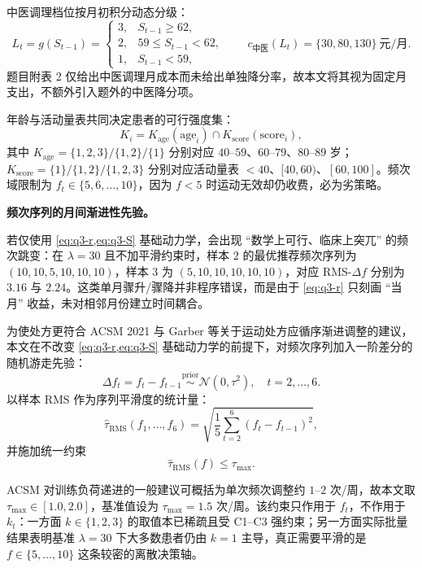 \documentclass{MathorCupmodeling}
\begin{document}
中医调理档位按月初积分动态分级：
\begin{equation}\label{eq:q3-L}
L_t = g(S_{t-1}) =
\begin{cases}
3, & S_{t-1} \ge 62, \\
2, & 59 \le S_{t-1} < 62, \\
1, & S_{t-1} < 59,
\end{cases}
\qquad c_{\text{中医}}(L_t)=\{30,80,130\}\ \text{元/月}.
\end{equation}
题目附表 2 仅给出中医调理月成本而未给出单独降分率，故本文将其视为固定月支出，不额外引入题外的中医降分项。

年龄与活动量表共同决定患者的可行强度集：
\begin{equation}
K_i = K_{\text{age}}(\text{age}_i) \cap K_{\text{score}}(\text{score}_i),
\end{equation}
其中 $K_{\text{age}}=\{1,2,3\}/\{1,2\}/\{1\}$ 分别对应 $40$--$59$、$60$--$79$、$80$--$89$ 岁；$K_{\text{score}}=\{1\}/\{1,2\}/\{1,2,3\}$ 分别对应活动量表 $<40$、$[40,60)$、$[60,100]$。频次域限制为 $f_t\in\{5,6,\dots,10\}$，因为 $f<5$ 时运动无效却仍收费，必为劣策略。

\noindent\textbf{频次序列的月间渐进性先验。}

若仅使用 \cref{eq:q3-r,eq:q3-S} 基础动力学，会出现 “数学上可行、临床上突兀” 的频次跳变：在 $\lambda=30$ 且不加平滑约束时，样本 $2$ 的最优推荐频次序列为 $(10,10,5,10,10,10)$，样本 $3$ 为 $(5,10,10,10,10,10)$，对应 RMS-$\Delta f$ 分别为 $3.16$ 与 $2.24$。这类单月骤升/骤降并非程序错误，而是由于 \cref{eq:q3-r} 只刻画 “当月” 收益，未对相邻月份建立时间耦合。

为使处方更符合 ACSM 2021 与 Garber 等关于运动处方应循序渐进调整的建议\cite{acsm2021,garber2011}，本文在不改变 \cref{eq:q3-r,eq:q3-S} 基础动力学的前提下，对频次序列加入一阶差分的随机游走先验：
\begin{equation}\label{eq:q3-prior}
\Delta f_t = f_t - f_{t-1} \overset{\text{prior}}{\sim} \mathcal{N}(0,\tau^2),\quad t=2,\dots,6.
\end{equation}
以样本 RMS 作为序列平滑度的统计量：
\begin{equation}\label{eq:q3-rms}
\widehat\tau_{\mathrm{RMS}}(f_1,\dots,f_6) = \sqrt{\frac{1}{5}\sum_{t=2}^{6}(f_t-f_{t-1})^2},
\end{equation}
并施加统一约束
\begin{equation}\label{eq:q3-smoothness}
\widehat\tau_{\mathrm{RMS}}(f) \le \tau_{\max}.
\end{equation}

ACSM 对训练负荷递进的一般建议可概括为单次频次调整约 $1$--$2$ 次/周\cite{acsm2021,garber2011}，故本文取 $\tau_{\max}\in[1.0,2.0]$，基准值设为 $\tau_{\max}=1.5$ 次/周。该约束只作用于 $f_t$，不作用于 $k_t$：一方面 $k\in\{1,2,3\}$ 的取值本已稀疏且受 C1--C3 强约束；另一方面实际批量结果表明基准 $\lambda=30$ 下大多数患者仍由 $k=1$ 主导，真正需要平滑的是 $f\in\{5,\dots,10\}$ 这条较密的离散决策轴。
\end{document}
